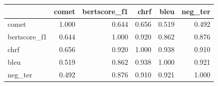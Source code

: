 \begin{tabular}{lrrrrr}
\toprule
 & comet & bertscore\_f1 & chrf & bleu & neg\_ter \\
\midrule
comet & 1.000 & 0.644 & 0.656 & 0.519 & 0.492 \\
bertscore\_f1 & 0.644 & 1.000 & 0.920 & 0.862 & 0.876 \\
chrf & 0.656 & 0.920 & 1.000 & 0.938 & 0.910 \\
bleu & 0.519 & 0.862 & 0.938 & 1.000 & 0.921 \\
neg\_ter & 0.492 & 0.876 & 0.910 & 0.921 & 1.000 \\
\bottomrule
\end{tabular}
